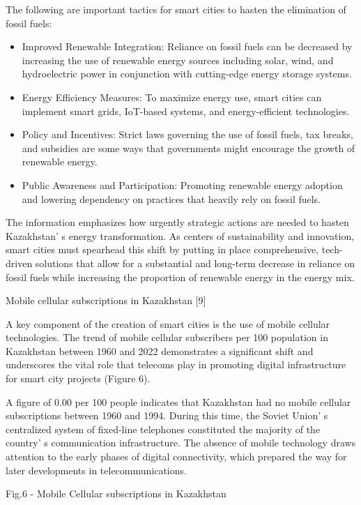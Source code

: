 {The following are important tactics for smart cities to hasten the
elimination of fossil fuels:

\begin{itemize}
\item
  Improved Renewable Integration: Reliance on fossil fuels can be
  decreased by increasing the use of renewable energy sources including
  solar, wind, and hydroelectric power in conjunction with cutting-edge
  energy storage systems.
\item
  Energy Efficiency Measures: To maximize energy use, smart cities can
  implement smart grids, IoT-based systems, and energy-efficient
  technologies.
\item
  Policy and Incentives: Strict laws governing the use of fossil fuels,
  tax breaks, and subsidies are some ways that governments might
  encourage the growth of renewable energy.
\item
  Public Awareness and Participation: Promoting renewable energy
  adoption and lowering dependency on practices that heavily rely on
  fossil fuels.
\end{itemize}

The information emphasizes how urgently strategic actions are needed to
hasten Kazakhstan' s energy transformation. As centers of
sustainability and innovation, smart cities must spearhead this shift by
putting in place comprehensive, tech-driven solutions that allow for a
substantial and long-term decrease in reliance on fossil fuels while
increasing the proportion of renewable energy in the energy mix.

Mobile cellular subscriptions in Kazakhstan {[}9{]}

A key component of the creation of smart cities is the use of mobile
cellular technologies. The trend of mobile cellular subscribers per 100
population in Kazakhstan between 1960 and 2022 demonstrates a
significant shift and underscores the vital role that telecoms play in
promoting digital infrastructure for smart city projects (Figure 6).

A figure of 0.00 per 100 people indicates that Kazakhstan had no mobile
cellular subscriptions between 1960 and 1994. During this time, the
Soviet Union' s centralized system of fixed-line
telephones constituted the majority of the country' s
communication infrastructure. The absence of mobile technology draws
attention to the early phases of digital connectivity, which prepared
the way for later developments in telecommunications.

Fig.6 - Mobile Cellular subscriptions in Kazakhstan

}
